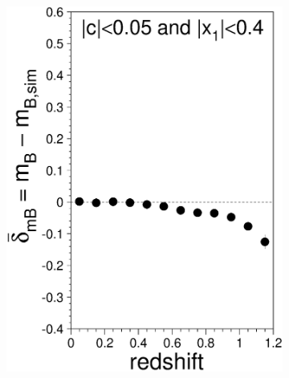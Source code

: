 \documentclass[11pt,a4paper]{paper}
\begin{document}
\begin{figure}[htbp!]
    \centering
    \begin{subfigure}[t]{.20\linewidth}
        \centering
        \includegraphics[width=\linewidth]{Answer_figures/Fig_biasCor_mb.eps}
    \end{subfigure}
    \begin{subfigure}[t]{.20\linewidth}
        \centering

\end{subfigure}
\end{figure}
\end{document}
